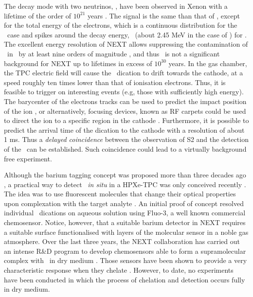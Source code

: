 \documentclass[aps,prl,reprint,longbibliography,superscriptaddress, english]{revtex4-1}
\begin{document}
The decay mode with two neutrinos, \bbtnu, have been observed in Xenon with a lifetime of the order of $10^{21}$ years \cite{Ackerman:2011gz}. The  signal is the same than that of \bbonu, except for the total energy of the electrons, which is a continuous distribution for the \bbtnu\ case and spikes around the decay energy, \Qbb\ (about 2.45 MeV in the case of \XE) for \bbonu. The excellent energy resolution of NEXT allows suppressing the contamination of \bbonu\ in \bbtnu\ by at least nine orders of magnitude \cite{rivilla_fluorescent_2020}, and thus \bbonu\ is not a significant background for NEXT up to lifetimes in excess of $10^{30}$ years. In the gas chamber, the TPC electric field will cause the \Bapp\ dication to drift towards the cathode, at a speed roughly ten times lower than that of ionisation electrons. Thus, it is feasible to trigger on interesting events (e.g, those with sufficiently high energy). The barycenter of the electrons tracks can be used to predict the impact position of the ion \cite{rivilla_fluorescent_2020}, or alternatively, focusing devices, known as RF carpets could be used to direct the ion to a specific region in the cathode \cite{NEXT:2021idl}. Furthermore, it is possible to predict the arrival time of the dication to the cathode with a resolution of about 1 ms. Thus a {\it delayed coincidence} between the observation of S2 and the detection of the \Bapp\ can be established. Such coincidence could lead to a virtually background free experiment. 

Although the barium tagging concept was proposed more than three decades ago \cite{Moe:1991ik}, a practical way to detect \Bapp\ {\it in situ} in a HPXe-TPC was only conceived recently \cite{Nygren_2015, Jones:2016qiq}. The idea was to use fluorescent molecules that change their optical properties upon complexation with the target analyte \cite{valeur_chemical,wolfbeis_materials_2005}. An initial proof of concept \cite{McDonald:2017izm}  resolved individual \Bapp\ dications on aqueous solution using Fluo-3, a well known commercial chemosensor. Notice, however, that a suitable barium detector in NEXT requires a suitable surface functionalised with layers of the molecular sensor in a noble gas atmosphere. Over the last three years, the NEXT collaboration has carried out an intense R\&D program to develop chemosensors able to form a supramolecular complex with \Bapp\ in dry medium  \cite{Thapa:2019zjk, rivilla_fluorescent_2020,thapa_demonstration_2021}. Those sensors have been shown to provide a very characteristic response when they chelate \Bapp. However, to date,
no experiments have been conducted in which the process of chelation and detection occurs fully in dry medium.
\end{document}
